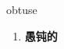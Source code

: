 
\begin{frame}
{\huge obtuse}
\begin{center}
\begin{enumerate}\Large
  \item \textbf{愚钝的}
\end{enumerate}
\end{center}
\end{frame}
